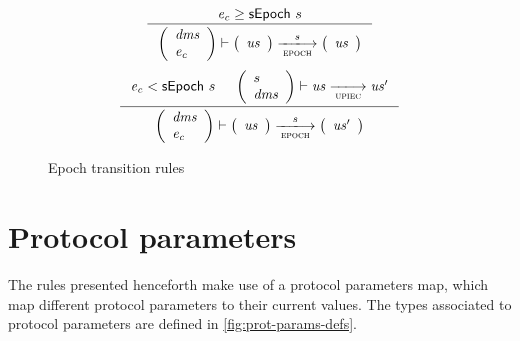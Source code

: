 \documentclass[11pt,a4paper]{article}
\newcommand{\var}[1]{\mathit{#1}}
\newcommand{\trans}[2]{\xlongrightarrow[\textsc{#1}]{#2}}
\begin{document}
\begin{figure}[ht]
  \begin{equation*}
    \inference
    {
      \var{e_c} \geq \sepoch{s}
    }
    {
      {\left(
        \begin{array}{l}
          \var{dms}\\
          \var{e_c}
        \end{array}
      \right)}
      \vdash
      {
        \left(
          {\begin{array}{c}
             \var{us}
           \end{array}
         }
       \right)
     }
     \trans{epoch}{s}
     {
       \left(
         {\begin{array}{c}
            \var{us}
          \end{array}
        }
      \right)
    }
  }
\end{equation*}
\vspace{20pt}
\begin{equation*}
  \inference
  {
    \var{e_c} < \sepoch{s}
    &
    {\left(
        \begin{array}{l}
          s\\
          \var{dms}
        \end{array}
      \right)
    }
    \vdash \var{us} \trans{upiec}{} \var{us'}
  }
  {
    {\left(
      \begin{array}{l}
        \var{dms}\\
        \var{e_c}
      \end{array}
    \right)}
    \vdash
    {
      \left(
        {\begin{array}{c}
           \var{us}
         \end{array}
       }
     \right)
   }
   \trans{epoch}{s}
   {
     \left(
       {\begin{array}{c}
          \var{us'}
        \end{array}
      }
    \right)
  }
}
\end{equation*}
\caption{Epoch transition rules}
\label{fig:rules:epoch}
\end{figure}

\clearpage

\section{Protocol parameters}

The rules presented henceforth make use of a protocol parameters map, which map
different protocol parameters to their current values. The types associated to
protocol parameters are defined in \cref{fig:prot-params-defs}.
\end{document}
